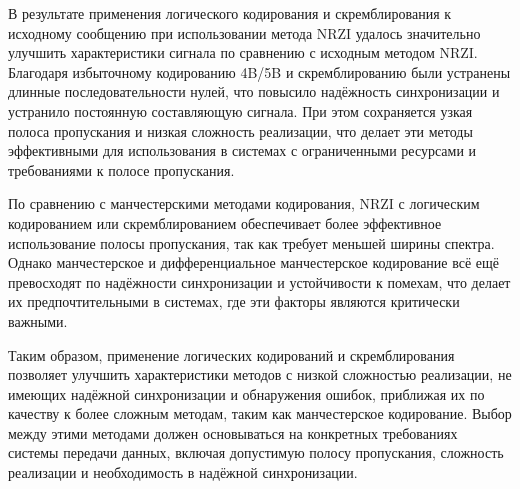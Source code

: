 В результате применения логического кодирования и скремблирования к исходному сообщению при использовании метода NRZI удалось значительно улучшить характеристики сигнала по сравнению с исходным методом NRZI. Благодаря избыточному кодированию 4B/5B и скремблированию были устранены длинные последовательности нулей, что повысило надёжность синхронизации и устранило постоянную составляющую сигнала. При этом сохраняется узкая полоса пропускания и низкая сложность реализации, что делает эти методы эффективными для использования в системах с ограниченными ресурсами и требованиями к полосе пропускания.

По сравнению с манчестерскими методами кодирования, NRZI с логическим кодированием или скремблированием обеспечивает более эффективное использование полосы пропускания, так как требует меньшей ширины спектра. Однако манчестерское и дифференциальное манчестерское кодирование всё ещё превосходят по надёжности синхронизации и устойчивости к помехам, что делает их предпочтительными в системах, где эти факторы являются критически важными.

Таким образом, применение логических кодирований и скремблирования позволяет улучшить характеристики методов с низкой сложностью реализации, не имеющих надёжной синхронизации и обнаружения ошибок, приближая их по качеству к более сложным методам, таким как манчестерское кодирование. Выбор между этими методами должен основываться на конкретных требованиях системы передачи данных, включая допустимую полосу пропускания, сложность реализации и необходимость в надёжной синхронизации.
